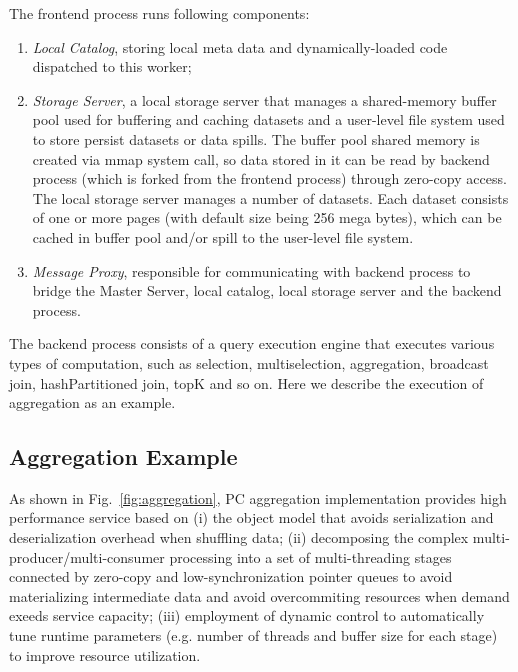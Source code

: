 The frontend process runs following components:

\begin{enumerate}
\item \emph{Local Catalog}, storing local meta data and dynamically-loaded code dispatched to this worker;
\item \emph{Storage Server}, a local storage server that manages a shared-memory buffer pool used for buffering and caching datasets and a user-level file system used to store persist datasets or data spills. The buffer pool shared memory is created via mmap system call, so data stored in it can be read by backend process (which is forked from the frontend process) through zero-copy access. The local storage server manages a number of datasets. Each dataset consists of one or more pages (with default size being 256 mega bytes), which can be cached in buffer pool and/or spill to the user-level file system.
\item \emph{Message Proxy},  responsible for communicating with backend process to bridge the Master Server, local catalog, local storage server and the backend process.

\end{enumerate}

The backend process consists of a query execution engine that executes various types of computation, such as selection, multiselection, aggregation, broadcast join, hashPartitioned join, topK and so on. Here we describe the execution of aggregation as an example.


\subsection{Aggregation Example}
As shown in Fig.~\ref{fig:aggregation},  PC aggregation implementation provides high performance service based on (i) the object model that avoids serialization and deserialization overhead when shuffling data; (ii) decomposing the complex multi-producer/multi-consumer processing into a set of multi-threading stages connected by zero-copy and low-synchronization pointer queues to avoid materializing intermediate data and avoid overcommiting resources when demand exeeds service capacity; (iii) employment of dynamic control to automatically tune runtime parameters (e.g. number of threads and buffer size for each stage) to improve resource utilization. 

